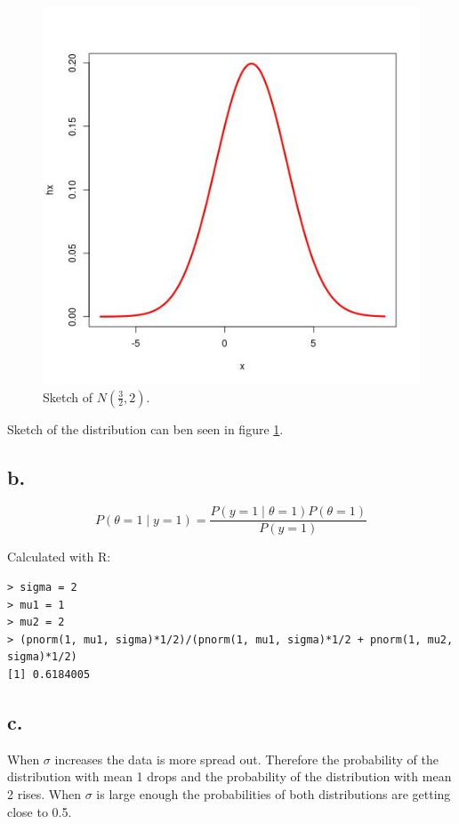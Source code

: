 \documentclass[11pt]{amsart}
\begin{document}
\begin{figure}[ht!]
  \includegraphics[width=\linewidth]{3-a}
  \caption{Sketch of $N(\frac{3}{2}, 2)$.}
  \label{fig:3-a}
\end{figure}

Sketch of the distribution can ben seen in figure \ref{fig:3-a}.

\subsection*{b.}

\[
    P(\theta = 1 \mid y = 1) = \frac{P(y=1 \mid \theta = 1) P(\theta=1)}{P(y=1)}
\]

Calculated with R:

\begin{verbatim}
> sigma = 2
> mu1 = 1
> mu2 = 2
> (pnorm(1, mu1, sigma)*1/2)/(pnorm(1, mu1, sigma)*1/2 + pnorm(1, mu2, sigma)*1/2)
[1] 0.6184005
\end{verbatim}

\subsection*{c.}

When $\sigma$ increases the data is more spread out. Therefore the probability of the distribution with mean 1 drops and the probability of the distribution with mean 2 rises. When $\sigma$ is large enough the probabilities of both distributions are getting close to 0.5.
\end{document}
